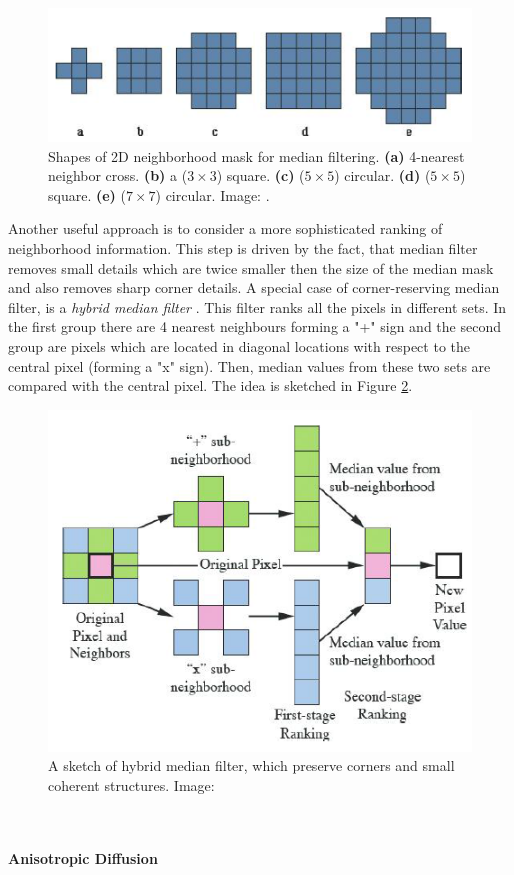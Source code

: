 \begin{figure}[ht]
  \centerline{
    \mbox{\includegraphics[scale=0.55]{figures/median_mask.png}}
  }
  \caption[]{Shapes of 2D neighborhood mask for median filtering. \textbf{(a)} 4-nearest neighbor cross. \textbf{(b)} a ($3 \times 3 $) square. \textbf{(c)} ($5 \times 5 $) circular. \textbf{(d)} ($5 \times 5 $) square. \textbf{(e)} ($7 \times 7 $) circular. Image: \cite{Russ11}.}
  \label{fig:median_mask}
\end{figure}

Another useful approach is to consider a more sophisticated ranking of neighborhood information. This step is driven by the fact, that median filter removes small details which are twice smaller then the size of the median mask and also removes sharp corner details. A special case of corner-reserving median filter, is a \textit{hybrid median filter} \cite{Nieminen87, Russ11}. This filter ranks all the pixels in different sets. In the first group there are 4 nearest neighbours forming a "+" sign and the second group are pixels which are located in diagonal locations with respect to the central pixel (forming a "x" sign). Then, median values from these two sets are compared with the central pixel. The idea is sketched in  Figure \ref{fig:hybrid_median_filter}.
\begin{figure}[ht]
  \centerline{
    \mbox{\includegraphics[scale=0.65]{figures/hybrid_median_filter.png}}
  }
  \caption[]{A sketch of hybrid median filter, which preserve corners and small coherent structures. Image: \cite{Russ11}}
  \label{fig:hybrid_median_filter}
\end{figure}
\\
\\
\textbf{Anisotropic Diffusion}

